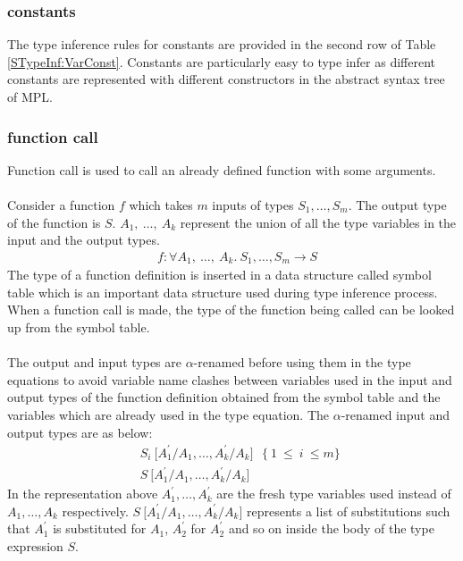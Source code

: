 \documentclass[11pt]{article}
\begin{document}
\subsubsection {constants}
The type inference rules for {\sf constants} are provided in the second row of Table \ref {STypeInf:VarConst}. Constants are particularly easy to type infer as different constants are represented with different constructors in the abstract syntax tree of MPL.

\subsubsection{function call}

Function call is used to call an already defined function with some arguments.
~~\\~~\\ 
Consider a function ${f}$ which takes ${m}$ inputs of types ${S_1,\ldots,S_m}$. The output type of the function is ${S}$. ${A_1,~ \ldots,~A_k}$ represent the union of all the type variables in the input and the output types.
\begin{align*} 
 & f:\forall A_1,~ \ldots,~A_k.~S_1,\ldots,S_m \to S 
\end{align*}
The type of a function definition is inserted in a data structure called symbol table which is an important data structure used during type inference process. When a function call is made, the type of the function being called can be looked up from the symbol table.
~~\\~~\\ 
The output and input types are $\alpha$-renamed before using them  in the type equations to avoid variable name clashes between variables used in the input and output types of the function definition obtained from the symbol table and the variables which are already used in the type equation. The $\alpha$-renamed input and output types are as below:
\begin{align*}
 & ~~ S_i~\Big[A_1^\prime/A_1,\ldots,A_k^\prime/A_k \Big] ~~~ \{~ 1~ \leq~ i~ \leq m\} \\
 & ~~ S~\Big[A_1^\prime/A_1,\ldots,A_k^\prime/A_k \Big]
 \end{align*}
 In the representation above ${A_1^\prime,\ldots,A_k^\prime}$ are the fresh type variables used instead of  ${A_1,\ldots,A_k}$ respectively. ${S~\big[A_1^\prime/A_1,\ldots,A_k^\prime/A_k \big]}$ represents a list of substitutions such that ${A_1^\prime}$ is substituted for ${A_1}$, ${A_2^\prime}$ for ${A_2^\prime}$ and so on inside the body of the type expression ${S}$.
\end{document}
